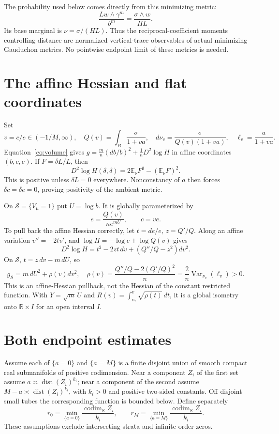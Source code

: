 \documentclass[11pt]{article}
\newcommand{\Var}{\operatorname{Var}}
\theoremstyle{remark}\newtheorem{remark}[theorem]{Remark}
\begin{document}
The probability used below comes directly from this minimizing metric:
\begin{equation}\label{eq:trace}
 \frac{Lw\wedge\gamma^m}{b^m}=\frac{\sigma\wedge w}{HL}.
\end{equation}
Its base marginal is $\nu=\sigma/(HL)$. Thus the reciprocal-coefficient
moments controlling distance are normalized vertical-trace observables
of actual minimizing Gauduchon metrics. No pointwise endpoint limit of
these metrics is needed.

\section{The affine Hessian and flat coordinates}
Set
\[
 v=c/e\in(-1/M,\infty),\quad Q(v)=\int_B\frac{\sigma}{1+va},
 \quad d\nu_v=\frac{\sigma}{Q(v)(1+va)},\quad
 \ell_v=\frac{a}{1+va}.
\]
Equation~\eqref{eq:volume} gives
$g=\frac{m}{n}(db/b)^2+\frac1nD^2\log H$ in affine coordinates
$(b,c,e)$. If $F=\delta L/L$, then
\[
 D^2\log H(\delta,\delta)=2\mathbb E_\nu F^2-(\mathbb E_\nu F)^2.
\]
This is positive unless $\delta L=0$ everywhere. Nonconstancy of $a$
then forces $\delta c=\delta e=0$, proving positivity of the ambient metric.

On $\mathcal S=\{V_\mu=1\}$ put $U=\log b$. It is globally parameterized by
\[
 e=\frac{Q(v)}{n e^{mU}},\qquad c=ve.
\]
To pull back the affine Hessian correctly, let $t=de/e$, $z=Q'/Q$.
Along an affine variation $v''=-2t v'$, and $\log H=-\log e+\log Q(v)$
gives
\[
 D^2\log H=t^2-2zt\,dv+(Q''/Q-z^2)dv^2.
\]
On $\mathcal S$, $t=z\,dv-m\,dU$, so
\begin{equation}\label{eq:flat}
 g_{\mathcal S}=m\,dU^2+\rho(v)dv^2,
 \quad\rho(v)=\frac{Q''/Q-2(Q'/Q)^2}{n}
 =\frac2n\Var_{\nu_v}(\ell_v)>0.
\end{equation}
This is an affine-Hessian pullback, not the Hessian of the constant
restricted function. With $Y=\sqrt m\,U$ and
$R(v)=\int_{v_*}^v\sqrt{\rho(t)}\,dt$, it is a global isometry
onto $\mathbb R\times I$ for an open interval $I$.

\section{Both endpoint estimates}
Assume each of $\{a=0\}$ and $\{a=M\}$ is a finite disjoint union of
smooth compact real submanifolds of positive codimension. Near a component
$Z_i$ of the first set assume $a\asymp\operatorname{dist}(Z_i)^{k_i}$;
near a component of the second assume
$M-a\asymp\operatorname{dist}(Z_i)^{k_i}$, with $k_i>0$ and positive
two-sided constants. Off disjoint small tubes the corresponding function
is bounded below. Define separately
\[
 r_0=\min_{\{a=0\}}\frac{\operatorname{codim}_{\mathbb R}Z_i}{k_i},
 \qquad r_M=\min_{\{a=M\}}\frac{\operatorname{codim}_{\mathbb R}Z_i}{k_i}.
\]
These assumptions exclude intersecting strata and infinite-order zeros.
\end{document}
